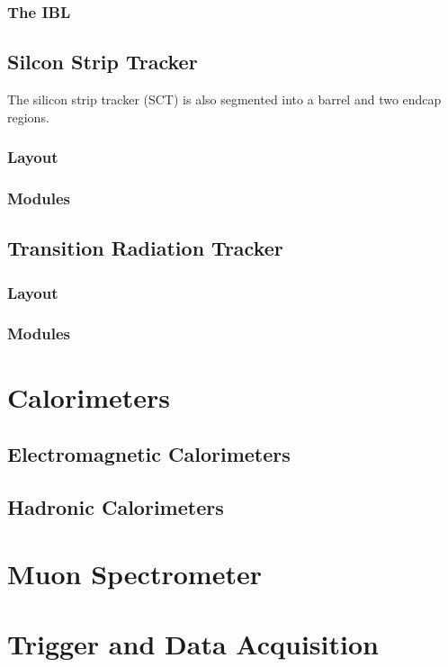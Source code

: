 \subsubsection{The IBL}

\subsection{Silcon Strip Tracker}

The silicon strip tracker (SCT) is also segmented into a barrel and
two endcap regions. 

\subsubsection{Layout}

\subsubsection{Modules}

\subsection{Transition Radiation Tracker}

\subsubsection{Layout}
\subsubsection{Modules}

\section{Calorimeters}
\subsection{Electromagnetic Calorimeters}
\subsection{Hadronic Calorimeters}
\section{Muon Spectrometer}
\section{Trigger and Data Acquisition}